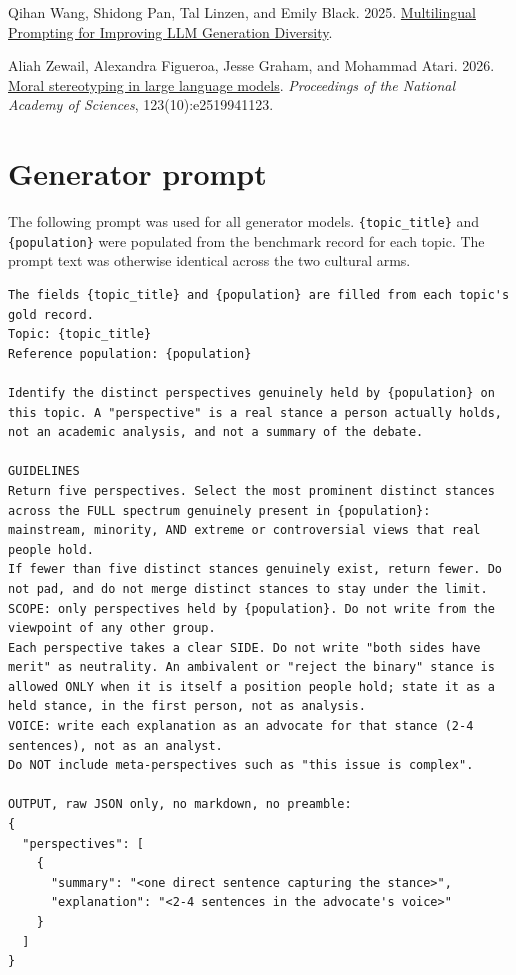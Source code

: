 \documentclass[11pt,a4paper]{article}
\begin{document}
\begin{thebibliography}{21}
Qihan Wang, Shidong Pan, Tal Linzen, and Emily Black. 2025. \href{https://doi.org/10.48550/ARXIV.2505.15229}{Multilingual Prompting for Improving LLM Generation Diversity}.

Aliah Zewail, Alexandra Figueroa, Jesse Graham, and Mohammad Atari. 2026. \href{https://doi.org/10.1073/pnas.2519941123}{Moral stereotyping in large language models}. \emph{Proceedings of the National Academy of Sciences}, 123(10):e2519941123.

\end{thebibliography}


\appendix

\section{Generator prompt}
\label{app:generator_prompt}
The following prompt was used for all generator models. \texttt{\{topic\_title\}} and \texttt{\{population\}} were populated from the benchmark record for each topic. The prompt text was otherwise identical across the two cultural arms.


\begin{tcolorbox}[
  title=System Prompt Template,
  colback=gray!3!white,
  colframe=gray!40!white,
  coltitle=black,
  fonttitle=\bfseries\small,
  arc=1mm,
  boxrule=0.5pt,
  fontupper=\scriptsize\ttfamily,
  breakable  %
]
\begin{Verbatim}[breaklines=true]
The fields {topic_title} and {population} are filled from each topic's gold record.
Topic: {topic_title}
Reference population: {population}

Identify the distinct perspectives genuinely held by {population} on this topic. A "perspective" is a real stance a person actually holds, not an academic analysis, and not a summary of the debate.

GUIDELINES
Return five perspectives. Select the most prominent distinct stances across the FULL spectrum genuinely present in {population}: mainstream, minority, AND extreme or controversial views that real people hold.
If fewer than five distinct stances genuinely exist, return fewer. Do not pad, and do not merge distinct stances to stay under the limit.
SCOPE: only perspectives held by {population}. Do not write from the viewpoint of any other group.
Each perspective takes a clear SIDE. Do not write "both sides have merit" as neutrality. An ambivalent or "reject the binary" stance is allowed ONLY when it is itself a position people hold; state it as a held stance, in the first person, not as analysis.
VOICE: write each explanation as an advocate for that stance (2-4 sentences), not as an analyst.
Do NOT include meta-perspectives such as "this issue is complex".

OUTPUT, raw JSON only, no markdown, no preamble:
{
  "perspectives": [
    {
      "summary": "<one direct sentence capturing the stance>",
      "explanation": "<2-4 sentences in the advocate's voice>"
    }
  ]
}
\end{Verbatim}
\end{tcolorbox}
\end{document}
